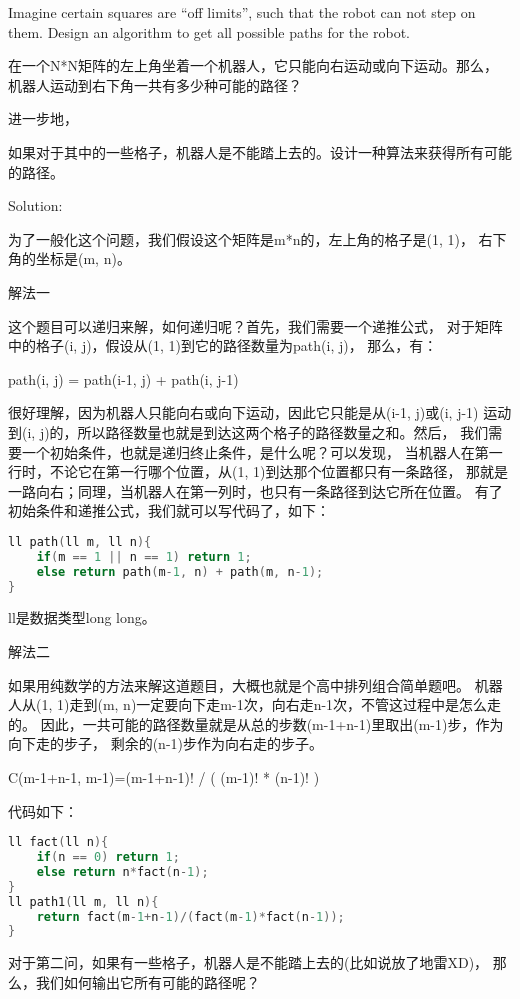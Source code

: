 \begin{description}
Imagine certain squares are “off limits”, such that the robot can not step on them. Design an algorithm to get all possible paths for the robot.

在一个N*N矩阵的左上角坐着一个机器人，它只能向右运动或向下运动。那么， 机器人运动到右下角一共有多少种可能的路径？

进一步地，

如果对于其中的一些格子，机器人是不能踏上去的。设计一种算法来获得所有可能的路径。

Solution: 

为了一般化这个问题，我们假设这个矩阵是m*n的，左上角的格子是(1, 1)， 右下角的坐标是(m, n)。

解法一

这个题目可以递归来解，如何递归呢？首先，我们需要一个递推公式， 对于矩阵中的格子(i, j)，假设从(1, 1)到它的路径数量为path(i, j)， 那么，有：

path(i, j) = path(i-1, j) + path(i, j-1)

很好理解，因为机器人只能向右或向下运动，因此它只能是从(i-1, j)或(i, j-1) 运动到(i, j)的，所以路径数量也就是到达这两个格子的路径数量之和。然后， 我们需要一个初始条件，也就是递归终止条件，是什么呢？可以发现， 当机器人在第一行时，不论它在第一行哪个位置，从(1, 1)到达那个位置都只有一条路径， 那就是一路向右；同理，当机器人在第一列时，也只有一条路径到达它所在位置。 有了初始条件和递推公式，我们就可以写代码了，如下：
\begin{lstlisting}[language=C++]
ll path(ll m, ll n){
    if(m == 1 || n == 1) return 1;
    else return path(m-1, n) + path(m, n-1);
}
\end{lstlisting}
ll是数据类型long long。

解法二

如果用纯数学的方法来解这道题目，大概也就是个高中排列组合简单题吧。 机器人从(1, 1)走到(m, n)一定要向下走m-1次，向右走n-1次，不管这过程中是怎么走的。 因此，一共可能的路径数量就是从总的步数(m-1+n-1)里取出(m-1)步，作为向下走的步子， 剩余的(n-1)步作为向右走的步子。

C(m-1+n-1, m-1)=(m-1+n-1)! / ( (m-1)! * (n-1)! )

代码如下：
\begin{lstlisting}[language=C++]
ll fact(ll n){
    if(n == 0) return 1;
    else return n*fact(n-1);
}
ll path1(ll m, ll n){
    return fact(m-1+n-1)/(fact(m-1)*fact(n-1));
}
\end{lstlisting}
对于第二问，如果有一些格子，机器人是不能踏上去的(比如说放了地雷XD)， 那么，我们如何输出它所有可能的路径呢？


\end{description}
